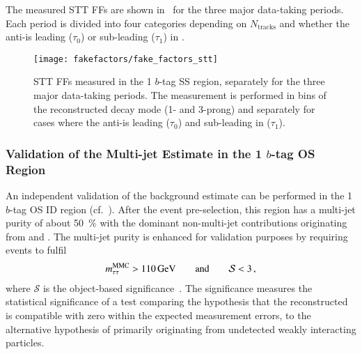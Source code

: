 
The measured STT FFs are shown in~ for the three major
data-taking periods. Each period is divided into four categories depending on
$N_{\text{tracks}}$ and whether the anti-\tauhadvis is leading ($\tau_0$) or
sub-leading ($\tau_1$) in \pT.

\begin{figure}[htbp]
  \centering

  \texttt{[image: fakefactors/fake\_factors\_stt]}

  \caption{STT FFs measured in the 1 $b$-tag SS region, separately for the three
    major data-taking periods. The measurement is performed in bins of the
    reconstructed \tauhadvis decay mode (1- and 3-prong) and separately for
    cases where the anti-\tauhadvis is leading ($\tau_0$) and sub-leading in \pT
    ($\tau_1$).}%
  \label{fig:mjfakes_stt_ffs}
\end{figure}


\subsubsection{Validation of the Multi-jet Estimate in the 1 $b$-tag OS Region}

An independent validation of the background estimate can be performed
in the 1 $b$-tag OS ID region (cf.\ ).
After the event pre-selection, this region has a multi-jet purity of
about \SI{50}{\percent} with the dominant non-multi-jet contributions
originating from \Zjets and \ttbar. The multi-jet purity is enhanced
for validation purposes by requiring events to fulfil
\begin{align*}
  m_{\tau\tau}^\text{MMC} > \SI{110}{\ensuremath{\text{GeV}}} \qquad \text{and} \qquad \mathcal{S} < 3 \,\text{,}
\end{align*}
where $\mathcal{S}$ is the object-based \pTmissAbs
significance~\cite{ATLAS-CONF-2018-038}. The \pTmissAbs significance
measures the statistical significance of a test comparing the
hypothesis that the reconstructed \pTmissAbs is compatible with zero
within the expected measurement errors, to the alternative hypothesis
of \pTmissAbs primarily originating from undetected weakly interacting
particles.

